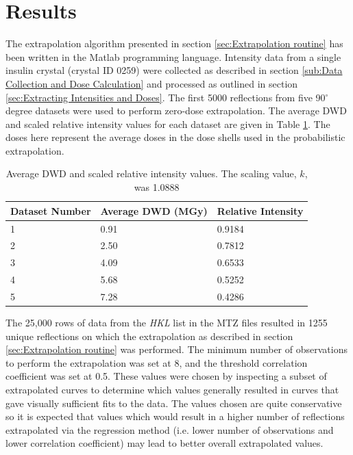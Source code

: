 \section{Results}
\label{sec:Results - Zero-dose extrapolation}
The extrapolation algorithm presented in section \ref{sec:Extrapolation routine} has been written in the Matlab programming language.
Intensity data from a single insulin crystal (crystal ID 0259) were collected as described in section \ref{sub:Data Collection and Dose Calculation} and processed as outlined in section \ref{sec:Extracting Intensities and Doses}.
The first 5000 reflections from five 90$^{\circ}$ degree datasets were used to perform zero-dose extrapolation.
The average DWD and scaled relative intensity values for each dataset are given in Table \ref{tab:Average DWD and Relative Intensity}.
The doses here represent the average doses in the dose shells used in the probabilistic extrapolation.
\begin{table}[ht!]
	\caption[Average DWD and scaled relative intensity values.]{Average DWD and scaled relative intensity values. The scaling value, $k$, was 1.0888}
	\centering
	\begin{tabular}{p{3.2cm} | p{3.75cm} | p{3.3cm}}
		Dataset Number    & Average DWD (MGy)     & Relative Intensity \\
		\hline
		1                 & 0.91                  & 0.9184 \\
		2                 & 2.50                  & 0.7812 \\
		3                 & 4.09                  & 0.6533 \\
        4                 & 5.68                  & 0.5252 \\
        5                 & 7.28                  & 0.4286 \\
	\end{tabular}
	\label{tab:Average DWD and Relative Intensity}
\end{table}
The 25,000 rows of data from the \textit{HKL} list in the MTZ files resulted in 1255 unique reflections on which the extrapolation as described in section \ref{sec:Extrapolation routine} was performed.
The minimum number of observations to perform the extrapolation was set at 8, and the threshold correlation coefficient was set at 0.5.
These values were chosen by inspecting a subset of extrapolated curves to determine which values generally resulted in curves that gave visually sufficient fits to the data.
The values chosen are quite conservative so it is expected that values which would result in a higher number of reflections extrapolated via the regression method (i.e. lower number of observations and lower correlation coefficient) may lead to better overall extrapolated values.
